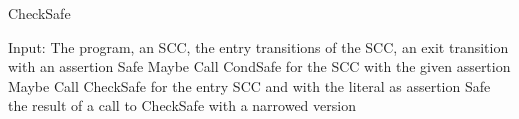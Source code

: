 \begin{algorithm}
\caption{CheckSafe}\label{checksafe}
\begin{algorithmic}[1]
  \State Input: The program, an SCC, the entry transitions of the SCC, an exit transition with an assertion
    \Return Safe
    \Return Maybe
  \EndIf
  \State Call CondSafe for the SCC with the given assertion
    \Return Maybe
  \EndIf
      \State Call CheckSafe for the entry SCC and with the literal as assertion
    \EndFor
  \EndFor
    \Return Safe
  \EndIf
  \Return the result of a call to CheckSafe with a narrowed version
\end{algorithmic}
\end{algorithm}
